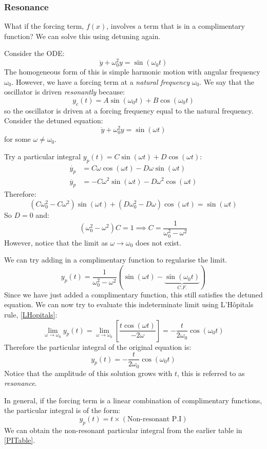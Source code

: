 \documentclass[../main.tex]{subfiles}
\begin{document}
\subsubsection{Resonance}
What if the forcing term, $f(x)$, involves a term that is in a complimentary function?
We can solve this using detuning again.
\begin{example}
  Consider the ODE:
  \[
    \ddot{y} + \omega_0^2 y = \sin(\omega_0 t)
  \]
  The homogeneous form of this is simple harmonic motion with angular frequency $\omega_0$.
  However, we have a forcing term at a \textit{natural frequency} $\omega_0$.
  We say that the oscillator is driven \textit{resonantly} because:
  \[
    y_c(t) = A\sin(\omega_0 t) + B\cos(\omega_0 t)
  \]
  so the oscillator is driven at a forcing frequency equal to the natural frequency.
  Consider the detuned equation:
  \[
    \ddot{y} + \omega^{2}_{0} y = \sin(\omega t)
  \]
  for some $\omega \neq \omega_0$.

  Try a particular integral $y_p(t) = C\sin(\omega t) + D \cos(\omega t)$:
  \begin{align*}
    \dot{y_p} &= C\omega\cos(\omega t) - D\omega\sin(\omega t) \\
    \ddot{y_p} &= -C\omega^2\sin(\omega t) - D\omega^2\cos(\omega t)
  \end{align*}
  Therefore:
  \[
    (C\omega^{2}_{0} - C\omega^2)\sin(\omega t) + (D\omega^{2}_{0} - D\omega)\cos(\omega t) = \sin(\omega t)
  \]
  So $D = 0$ and:
  \[
    (\omega^{2}_{0} - \omega^2)C = 1 \implies C = \frac{1}{\omega^{2}_{0} - \omega^2}
  \]
  However, notice that the limit as $\omega \to \omega_0$ does not exist.

  We can try adding in a complimentary function to regularise the limit.
  \[
    y_p(t) = \frac{1}{\omega^{2}_{0} - \omega^2}(\sin(\omega t) - \underbrace{\sin(\omega_0 t)}_{C.F.})
  \]
  Since we have just added a complimentary function, this still satisfies the detuned equation.
  We can now try to evaluate this indeterminate limit using L'H\^opitals rule, \cref{LHopitals}:
  \[
    \lim_{\omega \to \omega_0} y_p(t) = \lim_{\omega \to \omega_0} \left[\frac{t\cos(\omega t)}{-2\omega}\right] =-\frac{t}{2\omega_0}\cos(\omega_0 t)
  \]
  Therefore the particular integral of the original equation is:
  \[
    y_p(t) = -\frac{t}{2 \omega_0}\cos(\omega_0 t)
  \]
  Notice that the amplitude of this solution grows with $t$, this is referred to as \textit{resonance}.
\end{example}
In general, if the forcing term is a linear combination of complimentary functions, the particular integral is of the form:
\[
  y_p(t) = t \times (\text{Non-resonant P.I})
\]
We can obtain the non-resonant particular integral from the earlier table in \cref{PITable}.
\end{document}
